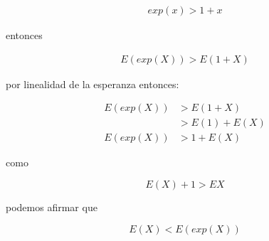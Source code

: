 \begin{itemize}
          \begin{align*}
              exp(x) > 1 +x
          \end{align*}

          entonces

          \begin{align*}
              E(exp(X))  > E(1+X)
          \end{align*}

          por linealidad de  la esperanza entonces:

          \begin{align*}
              E(exp(X)) & > E(1+X)    \\
                        & >E(1) +E(X) \\
              E(exp(X)) & > 1 + E(X)
          \end{align*}

          como

          \begin{equation*}
              E(X)+1 >EX
          \end{equation*}

          podemos afirmar que

          \begin{equation*}
              E(X) < E(exp(X))
          \end{equation*}
\end{itemize}